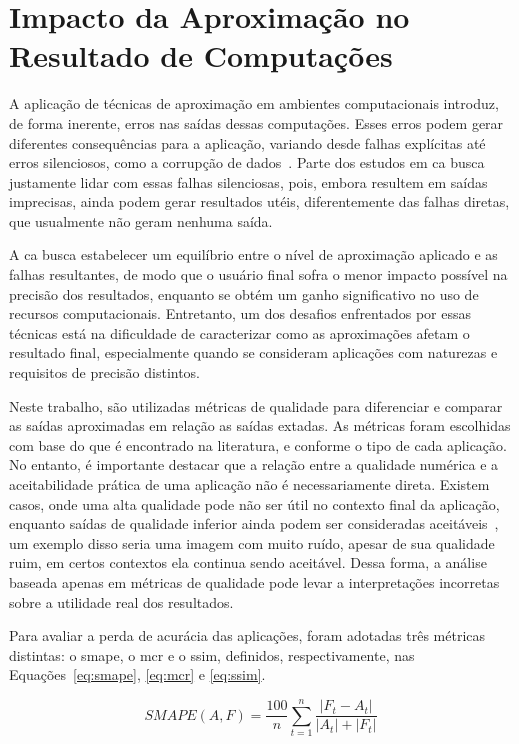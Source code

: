 \section{Impacto da Aproximação no Resultado de Computações}\label{sec:impacto}

A aplicação de técnicas de aproximação em ambientes computacionais introduz, de forma inerente, erros nas saídas dessas computações. Esses erros podem gerar diferentes consequências para a aplicação, variando desde falhas explícitas até erros silenciosos, como a corrupção de dados~\cite{fabricio2022}. Parte dos estudos em \gls{ca} busca justamente lidar com essas falhas silenciosas, pois, embora resultem em saídas imprecisas, ainda podem gerar resultados utéis, diferentemente das falhas diretas, que usualmente não geram nenhuma saída.

A \gls{ca} busca estabelecer um equilíbrio entre o nível de aproximação aplicado e as falhas resultantes, de modo que o usuário final sofra o menor impacto possível na precisão dos resultados, enquanto se obtém um ganho significativo no uso de recursos computacionais. Entretanto, um dos desafios enfrentados por essas técnicas está na dificuldade de caracterizar como as aproximações afetam o resultado final, especialmente quando se consideram aplicações com naturezas e requisitos de precisão distintos.

Neste trabalho, são utilizadas métricas de qualidade para diferenciar e comparar as saídas aproximadas em relação as saídas extadas. As métricas foram escolhidas com base do que é encontrado na literatura, e conforme o tipo de cada aplicação. No entanto, é importante destacar que a relação entre a qualidade numérica e a aceitabilidade prática de uma aplicação não é necessariamente direta. Existem casos, onde uma alta qualidade pode não ser útil no contexto final da aplicação, enquanto saídas de qualidade inferior ainda podem ser consideradas aceitáveis~\cite{felzmann2021}, um exemplo disso seria uma imagem com muito ruído, apesar de sua qualidade ruim, em certos contextos ela continua sendo aceitável. Dessa forma, a análise baseada apenas em métricas de qualidade pode levar a interpretações incorretas sobre a utilidade real dos resultados.

Para avaliar a perda de acurácia das aplicações, foram adotadas três métricas distintas: o \gls{smape}, o \gls{mcr} e o \gls{ssim}, definidos, respectivamente, nas Equações~\autoref{eq:smape}, \autoref{eq:mcr} e \autoref{eq:ssim}.

\begin{equation}
    SMAPE(A, F) = \frac{100}{n} \sum^{n}_{t=1}\frac{|F_t - A_t|}{|A_t| + |F_t|}
    \label{eq:smape}
\end{equation}

